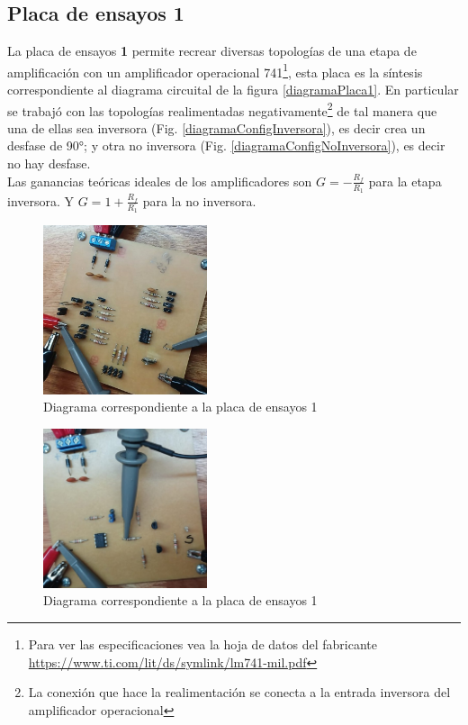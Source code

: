 \documentclass[letterpaper, 10 pt, conference]{ieeeconf}  %
\begin{document}
\subsection{Placa de ensayos 1}
La placa de ensayos \textbf{1} permite recrear diversas topologías de una etapa de amplificación con un amplificador operacional 741\footnote{Para ver las especificaciones vea la hoja de datos del fabricante \href{https://www.ti.com/lit/ds/symlink/lm741-mil.pdf}{https://www.ti.com/lit/ds/symlink/lm741-mil.pdf}}, esta placa es la síntesis correspondiente al diagrama circuital de la figura \ref{diagramaPlaca1}. En particular se trabajó con las topologías realimentadas negativamente\footnote{La conexión que hace la realimentación se conecta a la entrada inversora del amplificador operacional} de tal manera que una de ellas sea inversora (Fig. \ref{diagramaConfigInversora}), es decir crea un desfase de 90°; y otra no inversora (Fig. \ref{diagramaConfigNoInversora}), es decir no hay desfase. \\
\hspace*{3pt} Las ganancias teóricas ideales de los amplificadores son $G=-\frac{R_f}{R_1}$ para la etapa inversora. Y $G=1+\frac{R_f}{R_1}$ para la no inversora.
\begin{figure}[H]
  \centering
  \includegraphics[width=0.43\textwidth]{./placaDePruebas1.jpeg}
  \caption{Diagrama correspondiente a la placa de ensayos 1}
  \label{placaDePruebas1}
\end{figure}
\begin{figure}[H]
  \centering
  \includegraphics[width=0.43\textwidth]{./placaDePruebas2.jpeg}
  \caption{Diagrama correspondiente a la placa de ensayos 1}
  \label{placaDePruebas2}
\end{figure}
\end{document}
